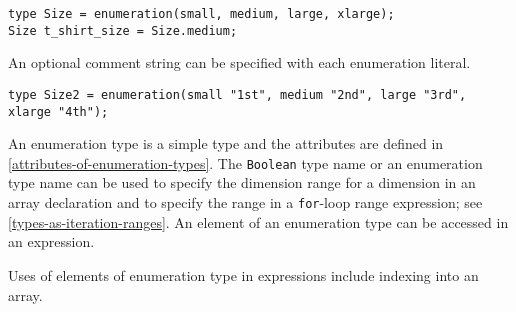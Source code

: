 \begin{example}
\begin{lstlisting}[language=modelica]
type Size = enumeration(small, medium, large, xlarge);
Size t_shirt_size = Size.medium;
\end{lstlisting}
\end{example}

An optional comment string can be specified with each enumeration literal.

\begin{example}
\begin{lstlisting}[language=modelica]
type Size2 = enumeration(small "1st", medium "2nd", large "3rd", xlarge "4th");
\end{lstlisting}
\end{example}

An enumeration type is a simple type and the attributes are defined in \cref{attributes-of-enumeration-types}.
The \lstinline!Boolean! type name or an enumeration type name can be used to specify the dimension range for a dimension in an array declaration and to specify the range in a \lstinline!for!-loop range expression; see \cref{types-as-iteration-ranges}.
An element of an enumeration type can be accessed in an expression.

\begin{nonnormative}
Uses of elements of enumeration type in expressions include indexing into an array.
\end{nonnormative}

